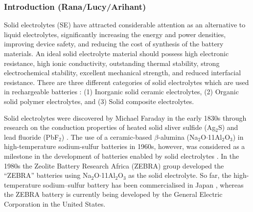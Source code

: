 \documentclass[../main.tex]{subfiles}
\begin{document}
\subsubsection{Introduction (Rana/Lucy/Arihant)}

Solid electrolytes (SE) have attracted considerable attention as an alternative to liquid electrolytes, significantly increasing the energy and power densities, improving device safety, and reducing the cost of synthesis of the battery materials. \cite{janek_solid_2016, culver_designing_2018, famprikis_fundamentals_2019, goodenough_li-ion_2013, DIRICAN201927} 
An ideal solid electrolyte material should possess  high electronic resistance, high ionic conductivity, outstanding thermal stability, strong electrochemical stability, excellent mechanical strength, and reduced interfacial resistance. \cite{han2020recent, manthiram2017} There are three different categories of solid electrolytes which are used in rechargeable batteries \cite{DIRICAN201927}: (1) Inorganic solid ceramic electrolytes, (2) Organic solid polymer electrolytes, and (3) Solid composite electrolytes. 

Solid electrolytes were discovered by Michael Faraday in the early 1830s through research on the conduction properties of heated solid sliver sulfide (Ag$_{2}$S) and lead fluoride (PbF$_{2}$) \cite{Faraday1833}. 
The use of a ceramic-based $\beta$-alumina (Na$_{2}$O$\cdot$11Al$_{2}$O$_{3}$) in high-temperature sodium-sulfur batteries in 1960s, however, was considered as a milestone in the development of batteries enabled by solid electrolytes \cite{armand2008building}. In the 1980s the Zeolite Battery Research Africa (ZEBRA) group developed the ``ZEBRA'' batteries using Na$_{2}$O$\cdot$11Al$_{2}$O$_{3}$ as the solid electrolyte. \cite{ZEBRA}
So far, the high-temperature sodium–sulfur battery has been commercialised in Japan \cite{oshima2004}, whereas the ZEBRA battery is currently being developed by the General Electric Corporation in the United States. \cite{capasso2014} 
\end{document}
